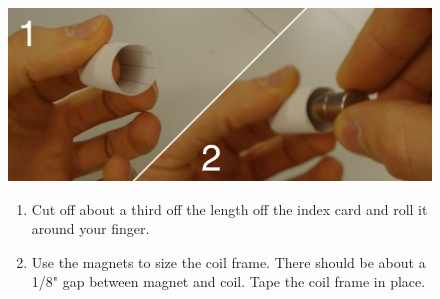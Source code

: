 \documentclass[11pt]{article}
\begin{document}
\vspace{0.5cm}

\begin{figure}[H]
	\begin{minipage}[b]{0.69\linewidth}
		\centering	\includegraphics[width=\textwidth]{images/coil_frame.pdf}
	\end{minipage}
	\hspace{0.1cm}
	\begin{minipage}[b]{0.3\linewidth}
		\begin{enumerate} \setcounter{enumi}{0}
			\item Cut off about a third off the length off the index card and roll it around your finger.
			\item Use the magnets to size the coil frame. There should be about a 1/8" gap between magnet and coil. Tape the coil 					frame in place.
		\end{enumerate}
	\end{minipage}
\end{figure}

\vspace{1.8cm}
\end{document}
